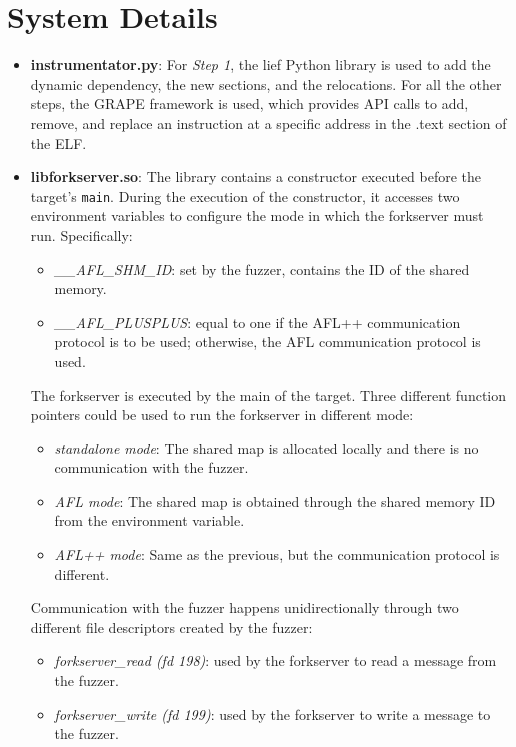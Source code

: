 \documentclass{report}
\begin{document}
            \section{System Details}
                \begin{itemize}
                    \item \textbf{instrumentator.py}: For \textit{Step 1}, the lief Python library is used to add the dynamic dependency, the new sections, and the relocations.
                            For all the other steps, the GRAPE framework is used, which provides API calls to add, remove, and replace an instruction at a specific address in the .text section of the ELF.
                    \item \textbf{libforkserver.so}: The library contains a constructor executed before the target's \texttt{main}.
                        During the execution of the constructor, it accesses two environment variables to configure the mode in which the forkserver must run. Specifically:
                        \begin{itemize}
                            \item \textit{\_\_AFL\_SHM\_ID}: set by the fuzzer, contains the ID of the shared memory.
                            \item \textit{\_\_AFL\_PLUSPLUS}: equal to one if the AFL++ communication protocol is to be used; otherwise, the AFL communication protocol is used.
                        \end{itemize}
                        The forkserver is executed by the main of the target. Three different function pointers could be used to run the forkserver in different mode:
                        \begin{itemize}
                            \item \textit{standalone mode}: The shared map is allocated locally and there is no communication with the fuzzer.
                            \item \textit{AFL mode}: The shared map is obtained through the shared memory ID from the environment variable.
                            \item \textit{AFL++ mode}: Same as the previous, but the communication protocol is different.
                        \end{itemize}
                        Communication with the fuzzer happens unidirectionally through two different file descriptors created by the fuzzer:
                        \begin{itemize}
                            \item \textit{forkserver\_read (fd 198)}: used by the forkserver to read a message from the fuzzer.
                            \item \textit{forkserver\_write (fd 199)}: used by the forkserver to write a message to the fuzzer.
                        \end{itemize}


\end{itemize}
\end{document}
